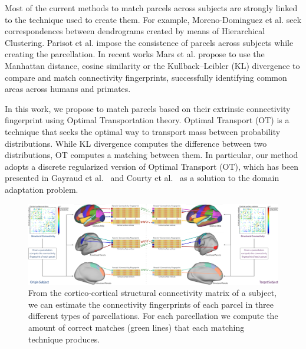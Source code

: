 Most of the current methods to match parcels across subjects are strongly
linked to the technique used to create them. For example,
Moreno-Dominguez et al. \cite{Moreno-Dominguez2014} seek correspondences between
dendrograms created by means of Hierarchical Clustering. 
Parisot et al. \cite{Paristot2015} impose the consistence of parcels across
subjects while creating the parcellation. In recent works Mars et al. propose
to use the Manhattan distance, cosine similarity \cite{Mars2016} or the
Kullback–Leibler (KL) divergence \cite{Mars2018} to compare and match connectivity
fingerprints, successfully identifying common areas across humans and primates.

In this work, we propose to match parcels based on their extrinsic connectivity
fingerprint using Optimal Transportation theory. Optimal Transport (OT) is a
technique that seeks the optimal way to transport mass between probability
distributions. While KL divergence computes the difference between two
distributions, OT computes a matching between them. In particular, our method
adopts a discrete regularized version of Optimal Transport (OT), which has been
presented in Gayraud et al.~\cite{Gayraud2017} and Courty et al.~\cite{Tuia2017} as a
solution to the domain adaptation problem.



\begin{figure}[t!]
\centering
\includegraphics[width=1\textwidth]{6.matching/img/method}
\caption{From the cortico-cortical structural connectivity matrix of a subject, we can estimate the connectivity fingerprints of each parcel in three different types of parcellations. For each parcellation we compute the amount of correct matches (green lines) that each matching technique produces.}
\label{fig:method}
\end{figure}

